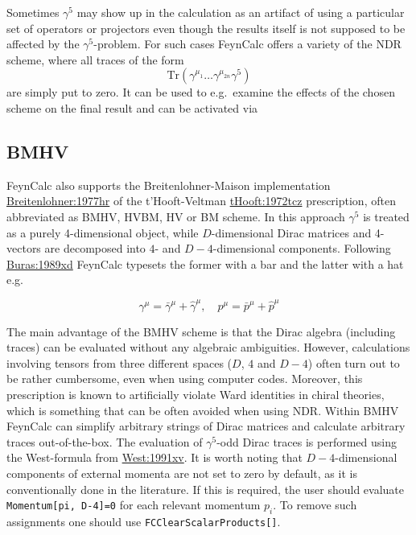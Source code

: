 \documentclass[../FeynCalcManual.tex]{subfiles}
\begin{document}
Sometimes \(\gamma^5\) may show up in the calculation as an artifact of
using a particular set of operators or projectors even though the
results itself is not supposed to be affected by the
\(\gamma^5\)-problem. For such cases FeynCalc offers a variety of the
NDR scheme, where all traces of the form \begin{equation}
\mathrm{Tr}(\gamma^{\mu_1} \ldots \gamma^{\mu_{2n}} \gamma^5)
\end{equation} are simply put to zero. It can be used to e.g.~examine
the effects of the chosen scheme on the final result and can be
activated via

\begin{Shaded}
\begin{Highlighting}[]
\OperatorTok{[}\OperatorTok{]}
\end{Highlighting}
\end{Shaded}

\subsection{BMHV}\label{bmhv}

FeynCalc also supports the Breitenlohner-Maison implementation
\href{https://doi.org/10.1007/BF01609069}{Breitenlohner:1977hr} of the
t'Hooft-Veltman
\href{https://doi.org/10.1016/0550-3213(72)90279-9}{tHooft:1972tcz}
prescription, often abbreviated as BMHV, HVBM, HV or BM scheme. In this
approach \(\gamma^5\) is treated as a purely 4-dimensional object, while
\(D\)-dimensional Dirac matrices and 4-vectors are decomposed into
\(4\)- and \(D-4\)-dimensional components. Following
\href{https://doi.org/10.1016/0550-3213(90)90223-Z}{Buras:1989xd}
FeynCalc typesets the former with a bar and the latter with a hat e.g.

\begin{equation}
\gamma^\mu = \bar{\gamma}^\mu + \hat{\gamma}^\mu, \quad p^\mu = \bar{p}^\mu + \hat{p}^\mu
\end{equation}

The main advantage of the BMHV scheme is that the Dirac algebra
(including traces) can be evaluated without any algebraic ambiguities.
However, calculations involving tensors from three different spaces
(\(D\), \(4\) and \(D-4\)) often turn out to be rather cumbersome, even
when using computer codes. Moreover, this prescription is known to
artificially violate Ward identities in chiral theories, which is
something that can be often avoided when using NDR. Within BMHV FeynCalc
can simplify arbitrary strings of Dirac matrices and calculate arbitrary
traces out-of-the-box. The evaluation of \(\gamma^5\)-odd Dirac traces
is performed using the West-formula from
\href{https://doi.org/10.1016/0010-4655(93)90011-Z}{West:1991xv}. It is
worth noting that \(D-4\)-dimensional components of external momenta are
not set to zero by default, as it is conventionally done in the
literature. If this is required, the user should evaluate
\texttt{Momentum[\allowbreak{}pi,\ \allowbreak{}D-4]=0} for each
relevant momentum \(p_i\). To remove such assignments one should use
\texttt{FCClearScalarProducts[\allowbreak{}]}.
\end{document}
